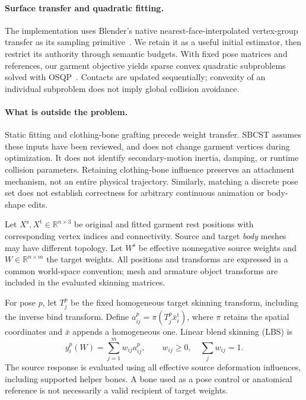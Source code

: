 \documentclass[10pt,twocolumn,letterpaper]{article}
\makeatletter
\newcommand{\R}{\mathbb{R}}
\newcommand{\src}{\mathrm{s}}
\newcommand{\tgt}{\mathrm{t}}
\renewcommand\section{\@startsection{section}{1}{\z@}{-2.0ex plus -.5ex minus -.2ex}{.9ex plus .2ex}{\normalfont\large\bfseries\raggedright}}
\makeatother
\begin{document}
\paragraph{Surface transfer and quadratic fitting.}
The implementation uses Blender's native nearest-face-interpolated vertex-group transfer as its sampling primitive~\cite{blender}. We retain it as a useful initial estimator, then restrict its authority through semantic budgets. With fixed pose matrices and references, our garment objective yields sparse convex quadratic subproblems solved with OSQP~\cite{osqp}. Contacts are updated sequentially; convexity of an individual subproblem does not imply global collision avoidance.

\paragraph{What is outside the problem.}
Static fitting and clothing-bone grafting precede weight transfer. SBCST assumes these inputs have been reviewed, and does not change garment vertices during optimization. It does not identify secondary-motion inertia, damping, or runtime collision parameters. Retaining clothing-bone influence preserves an attachment mechanism, not an entire physical trajectory. Similarly, matching a discrete pose set does not establish correctness for arbitrary continuous animation or body-shape edits.

\section{Problem Formulation}
\label{sec:formulation}
Let $X^\src,X^\tgt\in\R^{n\times3}$ be original and fitted garment rest positions with corresponding vertex indices and connectivity. Source and target \emph{body} meshes may have different topology. Let $W^\src$ be effective nonnegative source weights and $W\in\R^{n\times m}$ the target weights. All positions and transforms are expressed in a common world-space convention; mesh and armature object transforms are included in the evaluated skinning matrices.

For pose $p$, let $T_j^p$ be the fixed homogeneous target skinning transform, including the inverse bind transform. Define $a_{ij}^p=\pi(T_j^p\bar x_i^\tgt)$, where $\pi$ retains the spatial coordinates and $\bar x$ appends a homogeneous one. Linear blend skinning (LBS) is
\begin{equation}
 y_i^p(W)=\sum_{j=1}^{m}w_{ij}a_{ij}^p,
 \qquad w_{ij}\geq0,\quad\sum_jw_{ij}=1.
 \label{eq:lbs}
\end{equation}
The source response is evaluated using all effective source deformation influences, including supported helper bones. A bone used as a pose control or anatomical reference is not necessarily a valid recipient of target weights.
\end{document}
